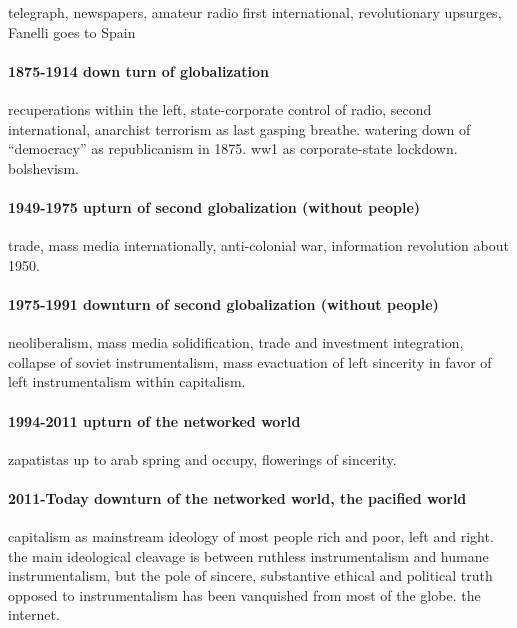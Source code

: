 \documentclass[12pt,book]{article}
\begin{document}
telegraph, newspapers, amateur radio first international, revolutionary
upsurges, Fanelli goes to Spain

\paragraph{1875-1914 down turn of
globalization}\label{down-turn-of-globalization}

recuperations within the left, state-corporate control of radio, second
international, anarchist terrorism as last gasping breathe. watering
down of ``democracy'' as republicanism in 1875. ww1 as corporate-state
lockdown. bolshevism.

\paragraph{1949-1975 upturn of second globalization (without
people)}\label{upturn-of-second-globalization-without-people}

trade, mass media internationally, anti-colonial war, information
revolution about 1950.

\paragraph{1975-1991 downturn of second globalization (without
people)}\label{downturn-of-second-globalization-without-people}

neoliberalism, mass media solidification, trade and investment
integration, collapse of soviet instrumentalism, mass evactuation of
left sincerity in favor of left instrumentalism within capitalism.

\paragraph{1994-2011 upturn of the networked
world}\label{upturn-of-the-networked-world}

zapatistas up to arab spring and occupy, flowerings of sincerity.

\paragraph{2011-Today downturn of the networked world, the pacified
world}\label{today-downturn-of-the-networked-world-the-pacified-world}

capitalism as mainstream ideology of most people rich and poor, left and
right. the main ideological cleavage is between ruthless instrumentalism
and humane instrumentalism, but the pole of sincere, substantive ethical
and political truth opposed to instrumentalism has been vanquished from
most of the globe. the internet.
\end{document}
